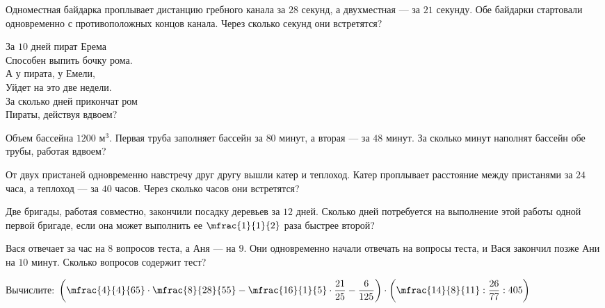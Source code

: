%
%

\begin{class}[number=1]
	
	\begin{listofex}
		\item Одноместная байдарка проплывает дистанцию гребного канала за \( 28 \) секунд, а двухместная --- за \( 21 \) секунду. Обе байдарки стартовали одновременно с противоположных концов канала. Через сколько секунд они встретятся?
		\item За \( 10 \) дней пират Ерема\\
		Способен выпить бочку рома.\\
		А у пирата, у Емели,\\
		Уйдет на это две недели.\\
		За сколько дней прикончат ром\\
		Пираты, действуя вдвоем?
		\item Объем бассейна \( 1200 \) м\( ^3 \). Первая труба заполняет бассейн за \( 80 \) минут, а вторая --- за \( 48 \) минут. За сколько минут наполнят бассейн обе трубы, работая вдвоем?
		\item От двух пристаней одновременно навстречу друг другу вышли катер и теплоход. Катер проплывает расстояние между пристанями за \( 24 \) часа, а теплоход --- за \( 40 \) часов. Через сколько часов они встретятся?
		\item Две бригады, работая совместно, закончили посадку деревьев за \( 12 \) дней. Сколько дней потребуется на выполнение этой работы одной первой бригаде, если она может выполнить ее \( \mfrac{1}{1}{2} \) раза быстрее второй?
		\item Вася отвечает за час на \( 8 \) вопросов теста, а Аня --- на \( 9 \). Они одновременно начали отвечать на вопросы теста, и Вася закончил позже Ани на \( 10 \) минут. Сколько вопросов содержит тест?
		\item Вычислите: \quad \( \left( \mfrac{4}{4}{65}\cdot \mfrac{8}{28}{55}-\mfrac{16}{1}{5}\cdot\dfrac{21}{25}-\dfrac{6}{125} \right)\cdot\left( \mfrac{14}{8}{11}:\dfrac{26}{77}:405 \right) \)
	\end{listofex}
\end{class}


